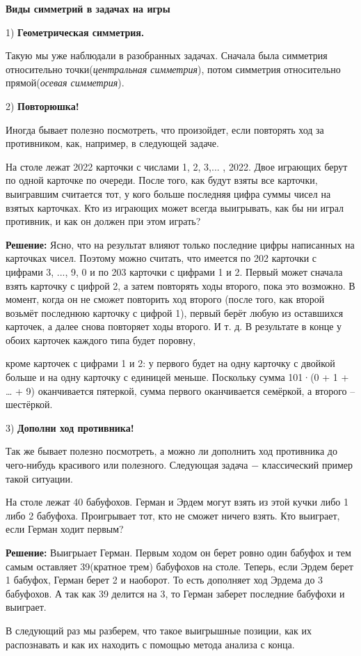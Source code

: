 \textbf{\Large Виды симметрий в задачах на игры}

\hspace{3mm}

1)\textbf{ Геометрическая симметрия.}

Такую мы уже наблюдали в разобранных задачах. Сначала была симметрия относительно точки(\textit{центральная симметрия}), потом симметрия относительно прямой(\textit{осевая симметрия}).

2) \textbf{Повторюшка!}

Иногда бывает полезно посмотреть, что произойдет, если повторять ход за противником, как, например, в следующей задаче.

На столе лежат 2022 карточки с числами 1, 2, 3,... , 2022. Двое играющих берут по одной карточке по очереди. После того, как будут взяты все карточки, выигравшим считается тот, у кого больше последняя цифра суммы чисел на взятых карточках. Кто из играющих может всегда выигрывать, как бы ни играл противник, и как он должен при этом играть?

\textbf{Решение:} Ясно, что на результат влияют только последние цифры написанных на карточках чисел. Поэтому можно считать, что имеется по 202 карточки с цифрами 3, ..., 9, 0 и по 203 карточки с цифрами 1 и 2. Первый может сначала взять карточку с цифрой 2, а затем повторять ходы второго, пока это возможно. В момент, когда он не сможет повторить ход второго (после того, как второй возьмёт последнюю карточку с цифрой 1), первый берёт любую из оставшихся карточек, а далее снова повторяет ходы второго. И т. д. В результате в конце у обоих карточек каждого типа будет поровну,

\noindent
кроме карточек с цифрами 1 и 2: у первого будет на одну карточку с двойкой больше и на одну карточку с единицей меньше. Поскольку сумма  101·(0 + 1 + … + 9)  оканчивается пятеркой, сумма первого оканчивается семёркой, а второго – шестёркой.

3) \textbf{Дополни ход противника!} 

Так же бывает полезно посмотреть, а можно ли дополнить ход противника до чего-нибудь красивого или полезного. Следующая задача $-$ классический пример такой ситуации.

На столе лежат 40 бабуфохов. Герман и Эрдем могут взять из этой кучки либо 1 либо 2 бабуфоха. Проигрывает тот, кто не сможет ничего взять. Кто выиграет, если Герман ходит первым?

\textbf{Решение: } Выигрыает Герман. Первым ходом он берет ровно один бабуфох и тем самым оставляет 39(кратное трем) бабуфохов на столе. Теперь, если Эрдем берет 1 бабуфох, Герман берет 2 и наоборот. То есть дополняет ход Эрдема до 3 бабуфохов. А так как 39 делится на 3, то Герман заберет последние бабуфохи и выиграет. 

В следующий раз мы разберем, что такое выигрышные позиции, как их распознавать и как их находить с помощью метода анализа с конца.